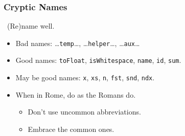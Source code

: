 \begin{frame}

\frametitle{Cryptic Names}

\begin{center}

\leftthumbsup~(Re)name well.~\rightthumbsup

\end{center}

\vspace{\fill}

\begin{itemize}

\item Bad names: \ldots\texttt{temp}\ldots, \ldots\texttt{helper}\ldots, \ldots\texttt{aux}\ldots

\item Good names: \texttt{toFloat}, \texttt{isWhitespace}, \texttt{name},
\texttt{id}, \texttt{sum}.

\item May be good names: \texttt{x}, \texttt{xs}, \texttt{n}, \texttt{fst},
\texttt{snd}, \texttt{ndx}.

\item When in Rome, do as the Romans do.

\begin{itemize}

\item Don't use uncommon abbreviations.

\item Embrace the common ones.

\end{itemize}

\end{itemize}

\end{frame}
